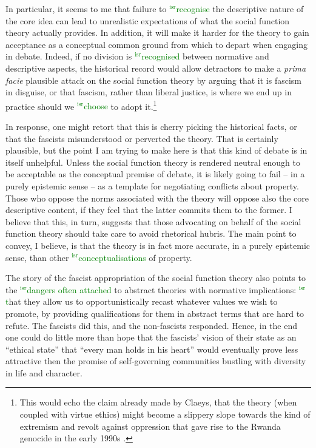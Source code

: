 \documentclass[12pt,a4paper]{book} %
\newcommand{\isr}[1]{\textcolor{green}{$^{\textrm{isr}}${#1}}}
\begin{document}
In particular, it seems to me that failure to \isr{recognise} the descriptive nature of the core idea can lead to unrealistic expectations of what the social function theory actually provides. In addition, it will make it harder for the theory to gain acceptance as a conceptual common ground from which to depart when engaging in debate. Indeed, if no division is \isr{recognised} between normative and descriptive aspects, the historical record would allow detractors to make a {\it prima facie} plausible attack on the social function theory by arguing that it is fascism in disguise, or that fascism, rather than liberal justice, is where we end up in practice should we \isr{choose} to adopt it.\footnote{This would echo the claim already made by Claeys, that the theory (when coupled with virtue ethics) might become a slippery slope towards the kind of extremism and revolt against oppression that gave rise to the Rwanda genocide in the early 1990s \cite[926-927]{claeys09}.}

In response, one might retort that this is cherry picking the historical facts, or that the fascists misunderstood or perverted the theory. That is certainly plausible, but the point I am trying to make here is that this kind of debate is in itself unhelpful. Unless the social function theory is rendered neutral enough to be acceptable as the conceptual premise of debate, it is likely going to fail -- in a purely epistemic sense -- as a template for negotiating conflicts about property. Those who oppose the norms associated with the theory will oppose also the core descriptive content, if they feel that the latter commits them to the former. I believe that this, in turn, suggests that those advocating on behalf of the social function theory should take care to avoid rhetorical hubris. The main point to convey, I believe, is that the theory is in fact more accurate, in a purely epistemic sense, than other \isr{conceptualisations} of property.

The story of the fascist appropriation of the social function theory also points to the \isr{dangers often attached} to abstract theories with normative implications: \isr{t}hat they allow us to opportunistically recast whatever values we wish to promote, by providing qualifications for them in abstract terms that are hard to refute. The fascists did this, and the non-fascists responded. Hence, in the end one could do little more than hope that the fascists' vision of their state as an ``ethical state'' that ``every man holds in his heart'' would eventually prove less attractive then the promise of self-governing communities bustling with diversity in life and character.
\end{document}
